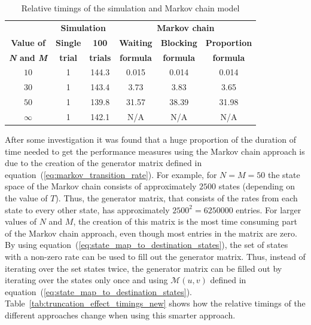 \tiny
\begin{table}[H]
    \centering
    \begin{tabular}{c|cc|ccc}
        & \multicolumn{2}{c}{\textbf{Simulation}} & 
        \multicolumn{3}{c}{\textbf{Markov chain}} \\
        \textbf{Value of} & \textbf{Single} & \textbf{100} & 
        \textbf{Waiting} & \textbf{Blocking} & 
        \textbf{Proportion} \\
        \textbf{\textit{N} and \textit{M}} & \textbf{trial} & \textbf{trials} & 
        \textbf{formula} & \textbf{formula} & \textbf{formula} \\
        \hline
        \(10\) & 1 & 144.3 & 0.015  & 0.014  & 0.014 \\
        \hline
        \(30\) & 1 & 143.4 & 3.73   & 3.83   & 3.65 \\
        \hline
        \(50\) & 1 & 139.8 & 31.57  & 38.39  & 31.98 \\
        \hline
        \(\infty\) & 1 & 142.1 & N/A & N/A & N/A \\
    \end{tabular}
    \caption{Relative timings of the simulation and Markov chain model}
    \label{tab:truncation_effect_timings_old}
\end{table}
\normalsize

After some investigation it was found that a huge proportion of the duration of
time needed to get the performance measures using the Markov chain approach is
due to the creation of the generator matrix defined in
equation~(\ref{eq:markov_transition_rate}).
For example, for \(N = M = 50\) the state space of the Markov chain consists
of approximately \(2500\) states (depending on the value of \(T\)).
Thus, the generator matrix, that consists of the rates from each state to every
other state, has approximately \(2500^2 = 6250000\) entries.
For larger values of \(N\) and \(M\), the creation of this matrix is the most
time consuming part of the Markov chain approach, even though most entries in
the matrix are zero.
By using equation~(\ref{eq:state_map_to_destination_states}), the set of states
with a non-zero rate can be used to fill out the generator matrix.
Thus, instead of iterating over the set states twice, the generator matrix can
be filled out by iterating over the states only once and using
\(\mathcal{M}(u,v)\) defined in
equation~(\ref{eq:state_map_to_destination_states}).
Table~\ref{tab:truncation_effect_timings_new} shows how the relative timings
of the different approaches change when using this smarter approach.


